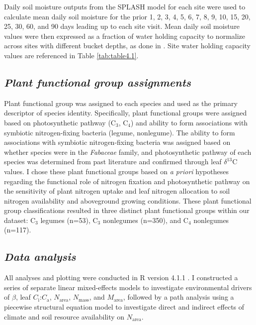 Daily soil moisture outputs from the SPLASH model for each site were used to calculate mean daily soil moisture for the prior 1, 2, 3, 4, 5, 6, 7, 8, 9, 10, 15, 20, 25, 30, 60, and 90 days leading up to each site visit. Mean daily soil moisture values were then expressed as a fraction of water holding capacity to normalize across sites with different bucket depths, as done in . Site water holding capacity values are referenced in Table \ref{tab:table4.1}.

\subsection{\textit{Plant functional group assignments}}
\noindent Plant functional group was assigned to each species and used as the primary descriptor of species identity. Specifically, plant functional groups were assigned based on photosynthetic pathway (C$_3$, C$_4$) and ability to form associations with symbiotic nitrogen-fixing bacteria (legume, nonlegume). The ability to form associations with symbiotic nitrogen-fixing bacteria was assigned based on whether species were in the \textit{Fabaceae} family, and photosynthetic pathway of each species was determined from past literature and confirmed through leaf $\delta^{13}$C values. I chose these plant functional groups based on \textit{a priori} hypotheses regarding the functional role of nitrogen fixation and photosynthetic pathway on the sensitivity of plant nitrogen uptake and leaf nitrogen allocation to soil nitrogen availability and aboveground growing conditions. These plant functional group classifications resulted in three distinct plant functional groups within our dataset: C$_3$ legumes (n=53), C$_3$ nonlegumes (n=350), and C$_4$ nonlegumes (n=117).

\subsection{\textit{Data analysis}}
\noindent All analyses and plotting were conducted in R version 4.1.1 . I constructed a series of separate linear mixed-effects models to investigate environmental drivers of $\beta$, leaf $C_\mathrm{i}$:$C_\mathrm{a}$, $N_\mathrm{area}$, $N_\mathrm{mass}$, and $M_\mathrm{area}$, followed by a path analysis using a piecewise structural equation model to investigate direct and indirect effects of climate and soil resource availability on $N_\mathrm{area}$.

